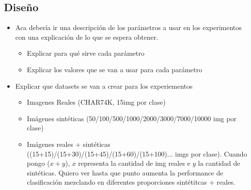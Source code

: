 \subsection{Diseño }
	\begin{itemize}
		\item Aca debería ir una descripción de los parámetros a usar en los experimentos con una explicación de lo que se espera obtener.
		\begin{itemize}
			\item Explicar para qué sirve cada parámetro
			\item Explicar los valores que se van a usar para cada parámetro
		\end{itemize}
		\item Explicar que datasets se van a crear para los experiementos
		\begin{itemize}
			\item Imagenes Reales (CHAR74K, 15img por clase)
			\item Imágenes sintéticas (50/100/500/1000/2000/3000/7000/10000 img por clase)
			\item Imágenes reales + sintéticas ((15+15)/(15+30)/(15+45)/(15+60)/(15+100)... imgs por clase). Cuando pongo ($x+y$), $x$ representa la cantidad de img reales e $y$ la cantidad de sintéticas. Quiero ver hasta que punto aumenta la performance de clasificación mezclando en diferentes proporciones sintétitcas + reales.
		\end{itemize}
	\end{itemize}
